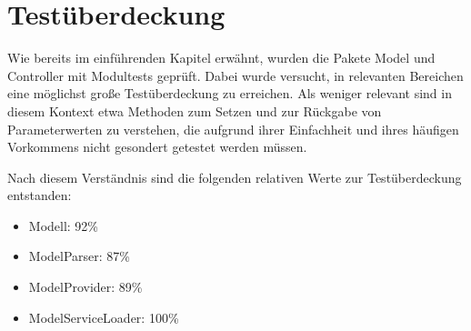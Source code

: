 \section{Testüberdeckung}

Wie bereits im einführenden Kapitel erwähnt, wurden die Pakete Model und Controller mit Modultests geprüft. Dabei wurde versucht, in relevanten Bereichen eine möglichst große Testüberdeckung zu erreichen. Als weniger relevant sind in diesem Kontext etwa Methoden zum Setzen und zur Rückgabe von Parameterwerten zu verstehen, die aufgrund ihrer Einfachheit und ihres häufigen Vorkommens nicht gesondert getestet werden müssen.

Nach diesem Verständnis sind die folgenden relativen Werte zur Testüberdeckung entstanden:

\begin{itemize}
\item Modell: 92\%
\item ModelParser: 87\%
\item ModelProvider: 89\%
\item ModelServiceLoader: 100\%

\end{itemize}


